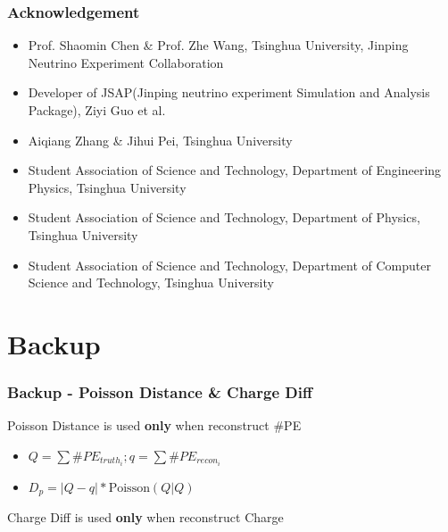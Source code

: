 \documentclass{beamer}
\begin{document}
\begin{frame}
\frametitle{Acknowledgement}
\begin{itemize}
    \item Prof. Shaomin Chen \& Prof. Zhe Wang, Tsinghua University, Jinping Neutrino Experiment Collaboration
    \item Developer of JSAP(Jinping neutrino experiment Simulation and Analysis Package), Ziyi Guo et al. 
    \item Aiqiang Zhang \& Jihui Pei, Tsinghua University
    \item Student Association of Science and Technology, Department of Engineering Physics, Tsinghua University
    \item Student Association of Science and Technology, Department of Physics, Tsinghua University
    \item Student Association of Science and Technology, Department of Computer Science and Technology, Tsinghua University
\end{itemize}
\end{frame}

\appendix
\section{Backup}
\begin{frame}[noframenumbering]
\thispagestyle{empty}
\frametitle{Backup - Poisson Distance \& Charge Diff}
\hspace{4mm}Poisson Distance is used \textbf{only} when reconstruct \#PE
\begin{itemize}
    \item $Q = \sum \#PE_{truth_i}; q = \sum \#PE_{recon_i}$
    \item $D_{p} = |Q-q|*\mathrm{Poisson}(Q|Q)$
\end{itemize}
\hspace{4mm}Charge Diff is used \textbf{only} when reconstruct Charge
\end{frame}
\end{document}
